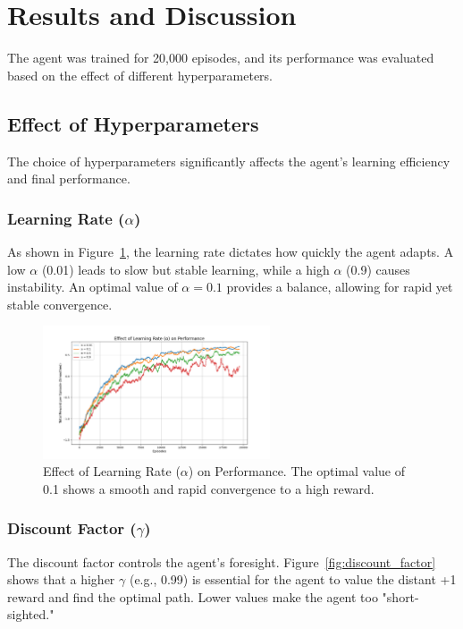 \documentclass{article}
\begin{document}
\section{Results and Discussion}
The agent was trained for 20,000 episodes, and its performance was evaluated based on the effect of different hyperparameters.

\subsection{Effect of Hyperparameters}
The choice of hyperparameters significantly affects the agent's learning efficiency and final performance.

\subsubsection{Learning Rate ($\alpha$)}
As shown in Figure~\ref{fig:learning_rate}, the learning rate dictates how quickly the agent adapts. A low $\alpha$ (0.01) leads to slow but stable learning, while a high $\alpha$ (0.9) causes instability. An optimal value of $\alpha=0.1$ provides a balance, allowing for rapid yet stable convergence.

\begin{figure}[H]
    \centering
    \includegraphics[width=0.6\textwidth]{../results/learning_rate_vs_episodes.png}
    \caption{Effect of Learning Rate ($\alpha$) on Performance. The optimal value of 0.1 shows a smooth and rapid convergence to a high reward.}
    \label{fig:learning_rate}
\end{figure}

\subsubsection{Discount Factor ($\gamma$)}
The discount factor controls the agent's foresight. Figure~\ref{fig:discount_factor} shows that a higher $\gamma$ (e.g., 0.99) is essential for the agent to value the distant +1 reward and find the optimal path. Lower values make the agent too "short-sighted."
\end{document}
